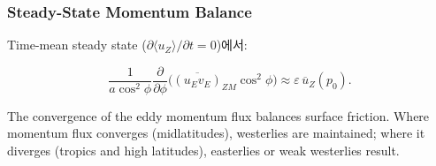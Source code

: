 \subsubsection{Steady-State Momentum Balance}

Time-mean steady state ($\partial\langle u_Z\rangle/\partial t = 0$)에서:

\begin{equation}\label{eq:u_steady}
  \boxed{
  \frac{1}{a\cos^2\phi}\frac{\partial}{\partial\phi}
    \bigl(\overline{(u_Ev_E)}_{ZM}\cos^2\phi\bigr)
  \approx \varepsilon\,\overline{u}_Z(p_0).
  }
\end{equation}

\begin{theorem}
The convergence of the eddy momentum flux balances surface friction.
Where momentum flux converges (midlatitudes), westerlies are maintained;
where it diverges (tropics and high latitudes), easterlies or weak
westerlies result.
\end{theorem}


